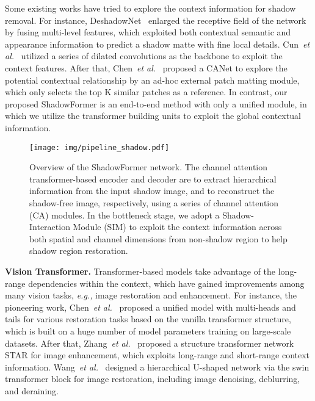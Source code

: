 \documentclass[letterpaper]{article} \usepackage{aaai23}  \usepackage{times}  \usepackage{helvet}  \usepackage{courier}  \usepackage[hyphens]{url}  \usepackage{graphicx} \urlstyle{rm} \def\UrlFont{\rm}  \usepackage{natbib}  \usepackage{caption} \frenchspacing  \setlength{\pdfpagewidth}{8.5in} \setlength{\pdfpageheight}{11in} \usepackage{algorithm}
\def\etal{\emph{et al.}}
\newcommand{\eg}{\textit{e.g., }}
\begin{document}
Some existing works have tried to explore the context information for shadow removal.
For instance, DeshadowNet~\cite{qu2017deshadownet} enlarged the receptive field of the network by fusing multi-level features, which exploited both contextual semantic and appearance information to predict a shadow matte with fine local details.
Cun~\etal~\cite{cun2020towards} utilized a series of dilated convolutions as the backbone to exploit the context features.
After that, Chen~\etal~\cite{chen2021canet} proposed a CANet to explore the potential contextual relationship by an ad-hoc external patch matting module, which only selects the top K similar patches as a reference.
In contrast, 
our proposed ShadowFormer is an end-to-end method with only a unified module, in which we utilize the transformer building units to exploit the global contextual information.

















\begin{figure*}[!t]
\centering
\vspace{-0.2cm}
\texttt{[image: img/pipeline\_shadow.pdf]} 
\vspace{-0.2cm}
\caption{Overview of the ShadowFormer network.
The channel attention transformer-based encoder and decoder are to extract hierarchical information from the input shadow image, and to reconstruct the shadow-free image, respectively, using a series of channel attention (CA) modules.
In the bottleneck stage, we adopt a Shadow-Interaction Module (SIM) to exploit the context information across both spatial and channel dimensions from non-shadow region to help shadow region restoration.
}
\label{fig:pipeline} 
\end{figure*}

\noindent
\textbf{Vision Transformer.}
Transformer-based models take advantage of the long-range dependencies within the context, which have gained improvements among many vision tasks, \eg image restoration and enhancement.
For instance, the pioneering work, Chen~\etal~\cite{chen2021IPT} proposed a unified model with multi-heads and tails for various restoration tasks based on the vanilla transformer structure, which is built on a huge number of model parameters training on large-scale datasets.
After that, 
Zhang~\etal~\cite{zhang2021star} proposed a structure transformer network STAR for image enhancement, which exploits long-range and short-range context information.
Wang~\etal~\cite{wang2021uformer} designed a hierarchical U-shaped network via the swin transformer block for image restoration, including image denoising, deblurring, and deraining.
\end{document}
